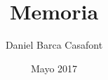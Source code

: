\documentclass{article}
\title{Memoria}
\author{Daniel Barca Casafont}
\date{Mayo 2017}
\begin{document}
\begin{titlepage}
\maketitle
\end{titlepage}

\tableofcontents

\clearpage

\end{document}
